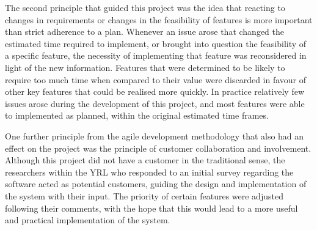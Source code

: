 The second principle that guided this project was the idea that reacting to changes in requirements or changes in the feasibility of features is more important than strict adherence to a plan. Whenever an issue arose that changed the estimated time required to implement, or brought into question the feasibility of a specific feature, the necessity of implementing that feature was reconsidered in light of the new information. Features that were determined to be likely to require too much time when compared to their value were discarded in favour of other key features that could be realised more quickly. In practice relatively few issues arose during the development of this project, and most features were able to implemented as planned, within the original estimated time frames.

One further principle from the agile development methodology that also had an effect on the project was the principle of customer collaboration and involvement. Although this project did not have a customer in the traditional sense, the researchers within the YRL who responded to an initial survey regarding the software acted as potential customers, guiding the design and implementation of the system with their input. The priority of certain features were adjusted following their comments, with the hope that this would lead to a more useful and practical implementation of the system.

